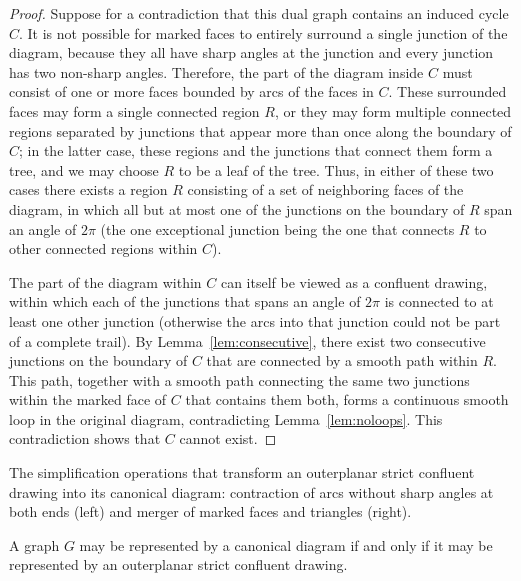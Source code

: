 \documentclass{llncs}
\begin{document}
\begin{proof}
Suppose for a contradiction that this dual graph contains an induced cycle $C$. It is not possible for marked faces to entirely surround a single junction of the diagram, because they all have sharp angles at the junction and every junction has two non-sharp angles. Therefore, the part of the diagram inside $C$ must consist of one or more faces bounded by arcs of the faces in $C$. These surrounded faces may form a single connected region $R$, or they may form multiple connected regions separated by junctions that appear more than once along the boundary of $C$; in the latter case, these regions and the junctions that connect them form a tree, and we may choose $R$ to be a leaf of the tree. Thus, in either of these two cases there exists a region $R$ consisting of a set of neighboring faces of the diagram, in which all but at most one of the junctions on the boundary of $R$ span an angle of $2\pi$ (the one exceptional junction being the one that connects $R$ to other connected regions within $C$).

The part of the diagram within $C$ can itself be viewed as a confluent drawing, within which each of the junctions that spans an angle of $2\pi$ is connected to at least one other junction (otherwise the arcs into that junction could not be part of a complete trail). By Lemma~\ref{lem:consecutive}, there exist two consecutive junctions on the boundary of $C$ that are connected by a smooth path within $R$. This path, together with a smooth path connecting the same two junctions within the marked face of $C$ that contains them both, forms a continuous smooth loop in the original diagram, contradicting Lemma~\ref {lem:noloops}. This contradiction shows that $C$ cannot exist.
\end{proof}

 {The simplification operations that transform an outerplanar strict confluent drawing into its canonical diagram: contraction of arcs without sharp angles at both ends (left) and merger of marked faces and triangles (right).}

\begin{lemma}
\label{lem:canonize}
A graph $G$ may be represented by a canonical diagram if and only if it may be represented by an outerplanar strict confluent drawing.
\end{lemma}
\end{document}
